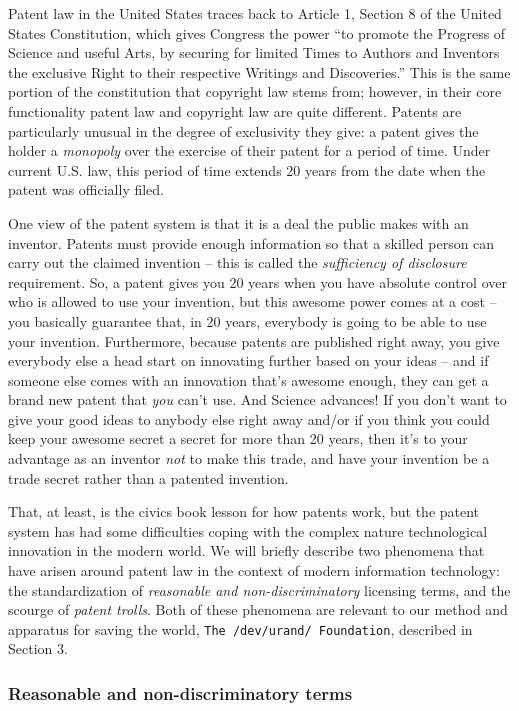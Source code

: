 \documentclass[acmtocl]%
{boviktrans}
\begin{document}
Patent law in the United States traces back to Article 1, Section 8 of
the United States Constitution, which gives Congress the power ``to
promote the Progress of Science and useful Arts, by securing for
limited Times to Authors and Inventors the exclusive Right to their
respective Writings and Discoveries.'' This is the same portion of the
constitution that copyright law stems from; however, in their core
functionality patent law and copyright law are quite
different. Patents are particularly unusual in the degree of
exclusivity they give: a patent gives the holder a {\it monopoly} over
the exercise of their patent for a period of time. Under current U.S.
law, this period of time extends 20 years from the date when the
patent was officially filed.

One view of the patent system is that it is a deal the public makes
with an inventor. Patents must provide enough information so that a
skilled person can carry out the claimed invention -- this is called
the {\it sufficiency of disclosure} requirement.  So, a patent gives
you 20 years when you have absolute control over who is allowed to use
your invention, but this awesome power comes at a cost -- you
basically guarantee that, in 20 years, everybody is going to be able
to use your invention. Furthermore, because patents are published
right away, you give everybody else a head start on innovating further
based on your ideas -- and if someone else comes with an innovation
that's awesome enough, they can get a brand new patent that {\it you}
can't use. And Science advances!  If you don't want to give your good
ideas to anybody else right away and/or if you think you could keep
your awesome secret a secret for more than 20 years, then it's to your
advantage as an inventor {\it not} to make this trade, and have your
invention be a trade secret rather than a patented invention.

That, at least, is the civics book lesson for how patents work, but
the patent system has had some difficulties coping with the complex
nature technological innovation in the modern world. We will briefly
describe two phenomena \cite{dododododod} that have arisen around
patent law in the context of modern information technology: the
standardization of {\it reasonable and non-discriminatory} licensing
terms, and the scourge of {\it patent trolls}. Both of these phenomena
\cite{dododododod} are relevant to our method and apparatus for saving
the world, {\tt The /dev/urand/ Foundation}, described in Section 3.

\subsubsection{Reasonable and non-discriminatory terms}
\label{sec:rand}
\end{document}
